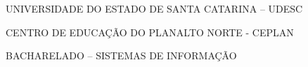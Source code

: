 

\renewcommand{\imprimircapa}{%
	\begin{capa}%
		\center

		{\fontseries{b}\selectfont\MakeTextUppercase{UNIVERSIDADE DO ESTADO DE SANTA CATARINA -- UDESC}}
		
		{\fontseries{b}\selectfont\MakeTextUppercase{CENTRO DE EDUCAÇÃO DO PLANALTO NORTE - CEPLAN  }}
		
		{\fontseries{b}\selectfont\MakeTextUppercase{BACHARELADO -- SISTEMAS DE INFORMAÇÃO  }}
		
		\vfill
		
		{\fontseries{b}\selectfont\MakeTextUppercase{\normalsize\imprimirautor}}
		
		\vfill
		\begin{center}
			{\fontseries{b}\selectfont\MakeTextUppercase{\imprimirtitulo}}
		\end{center}
		\vfill
		
		\vfill
		
		{\fontseries{b}\selectfont\MakeTextUppercase{\imprimirlocal}}
		\par
		{\selectfont \imprimirdata}
		\vspace*{1cm}
	\end{capa}
}



\imprimircapa				%

